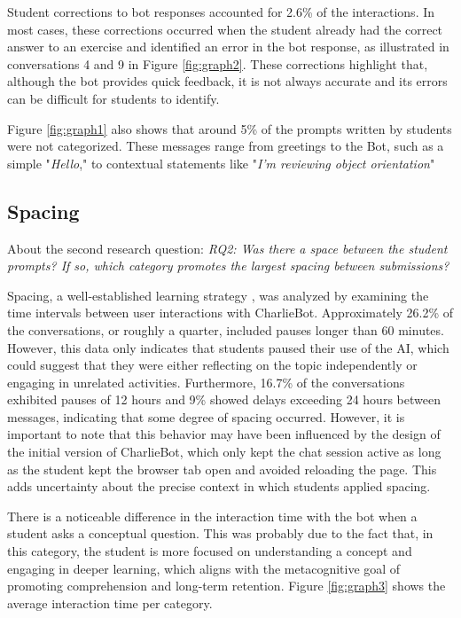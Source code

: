 \documentclass[a4paper,twoside]{article}
\begin{document}
Student corrections to bot responses accounted for 2.6\% of the
interactions. In most cases, these corrections occurred when the student already
had the correct answer to an exercise and identified an error in the bot
response, as illustrated in conversations 4 and 9 in Figure \ref{fig:graph2}.
These corrections highlight that, although the bot provides quick feedback, it
is not always accurate and its errors can be difficult for students to
identify.

Figure \ref{fig:graph1} also shows that around 5\% of the prompts written by
students were not categorized. These messages range from greetings to the Bot,
such as a simple "\textit{Hello}," to contextual statements like
"\textit{I'm reviewing object orientation}"

\subsection{Spacing}


About the second research question: \textit{RQ2: Was there a space between the
student prompts? If so, which category promotes the largest spacing between
submissions?}

Spacing, a well-established learning strategy \citep{Carvalho20}, was analyzed
by examining the time intervals between user interactions with CharlieBot.
Approximately 26.2\% of the conversations, or roughly a quarter, included pauses
longer than 60 minutes. However, this data only indicates that students paused
their use of the AI, which could suggest that they were either reflecting on the
topic independently or engaging in unrelated activities. Furthermore, 16.7\%
of the conversations exhibited pauses of 12 hours and 9\% showed delays
exceeding 24 hours between messages, indicating that some degree of spacing
occurred. However, it is important to note that this behavior may have been
influenced by the design of the initial version of CharlieBot, which only kept
the chat session active as long as the student kept the browser tab open and
avoided reloading the page. This adds uncertainty about the precise context in
which students applied spacing.

There is a noticeable difference in the interaction time with the bot when a
student asks a conceptual question. This was probably due to the fact that, in
this category, the student is more focused on understanding a concept and
engaging in deeper learning, which aligns with the metacognitive goal of
promoting comprehension and long-term retention. Figure \ref{fig:graph3}
shows the average interaction time per category.
\end{document}
